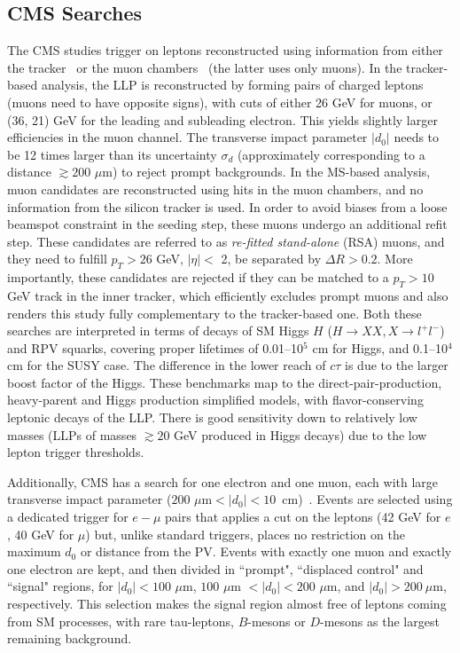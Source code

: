 \subsection{CMS Searches}
\label{sec:CMSleptonic}

The CMS studies trigger on leptons reconstructed using information from either the tracker~\cite{CMS:2014hka} or the muon chambers~\cite{CMS:2015pca} (the latter uses only muons).  
In the tracker-based analysis, the LLP is reconstructed by forming pairs of charged leptons (muons need to have opposite signs), with \pT cuts of either 26 GeV for  muons, or (36, 21) GeV for the leading and subleading electron. This yields slightly larger efficiencies in the muon channel. The transverse impact parameter $|d_0|$ needs to be 12 times larger than its uncertainty $\sigma_d$ (approximately corresponding to a distance $\gtrsim200\,\,\mu\mathrm{m}$) to reject prompt backgrounds.  In the MS-based analysis, muon candidates are reconstructed using  hits in the muon chambers, and no information from the silicon tracker is used. In order to avoid biases from a loose beamspot constraint in the seeding step, these muons undergo an additional refit step. These candidates are referred to as \emph{re-fitted stand-alone} (RSA) muons, and they need to fulfill $p_T > 26$ GeV,  $|\eta| <$ 2, be separated by $\Delta R > 0.2$. More importantly, these candidates are rejected if they can be matched to a $p_T > 10 $ GeV track in the inner tracker, which efficiently excludes prompt muons and also renders this study fully complementary to the tracker-based one. Both these searches are interpreted in terms of decays of SM Higgs $H$  ($H \to XX, X \to l^+ l^-$) and RPV squarks,  covering proper lifetimes of 0.01--10$^5$ cm for Higgs, and 0.1--10$^4$ cm for the SUSY case. The difference in the lower reach of $c \tau$ is due to the larger boost factor of the Higgs. These benchmarks map to the direct-pair-production, heavy-parent and Higgs production simplified models, with flavor-conserving leptonic decays of the LLP. There is good sensitivity down to relatively low masses (LLPs of masses $\gtrsim20$ GeV produced in Higgs decays) due to the low lepton trigger thresholds.

Additionally, CMS has a search for one electron and one muon, each with large transverse impact parameter ($200\,\, \mu \mathrm{m} < |d_{0}| <  10$~cm)~\cite{CMS-PAS-EXO-16-022}. Events are selected using a dedicated trigger for  $e-\mu$ pairs that  applies a \pT cut on the leptons (42 GeV for $e$, 40 GeV for $\mu$) but, unlike standard triggers, places no restriction on the maximum $d_{0}$ or distance from the PV. Events with exactly one muon and exactly one electron are kept, and then divided in ``prompt", ``displaced control" and ``signal" regions, for $|d_0| < 100\,\, \mu$m, $100\,\, \mu $m $ < |d_0| < 200\,\,\mu $m, and $|d_0| > 200~\mu $m, respectively. This selection makes the signal region almost free of leptons coming from SM processes, with rare tau-leptons, $B$-mesons or $D$-mesons as the largest remaining background. 

